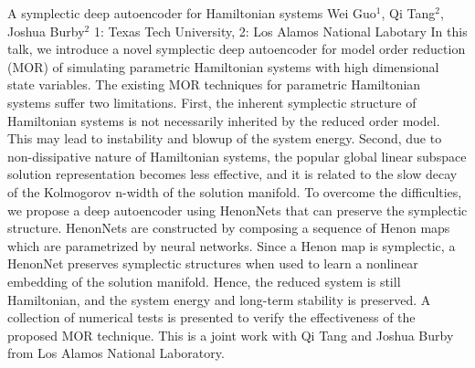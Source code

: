 \begin{addmargin}[2em]{0em}
\vspace{2ex}
\abs
{A symplectic deep autoencoder for Hamiltonian systems}
{Wei Guo$^{1}$, Qi Tang$^{2}$, Joshua Burby$^{2}$}
{1: Texas Tech University, 2: Los Alamos National Labotary}
{In this talk, we introduce a novel symplectic deep autoencoder for model order reduction (MOR) of simulating parametric Hamiltonian systems with high dimensional state variables. The existing MOR techniques for parametric Hamiltonian systems suffer two limitations. First, the inherent symplectic structure of Hamiltonian systems is not necessarily inherited by the reduced order model. This may lead to instability and blowup of the system energy. Second, due to non-dissipative nature of Hamiltonian systems, the popular global linear subspace solution representation becomes less effective, and it is related to the slow decay of the Kolmogorov n-width of the solution manifold. To overcome the difficulties, we propose a deep autoencoder using HenonNets that can preserve the symplectic structure. HenonNets are constructed by composing a sequence of Henon maps which are parametrized by neural networks. Since a Henon map is symplectic, a HenonNet preserves symplectic structures when used to learn a nonlinear embedding of the solution manifold. Hence, the reduced system is still Hamiltonian, and the system energy and long-term stability is preserved. A collection of numerical tests is presented to verify the effectiveness of the proposed MOR technique. This is a joint work with Qi Tang and Joshua Burby from Los Alamos National Laboratory.}



\end{addmargin}
